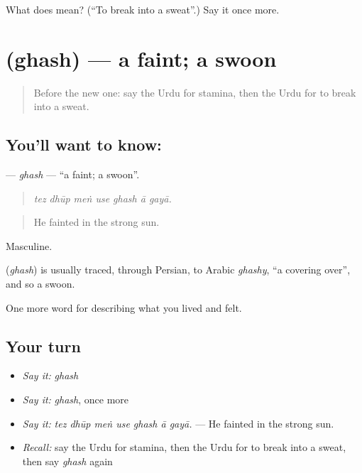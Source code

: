 \begin{tcolorbox}[breakable,colback=teal!4,colframe=teal!35!black,title={Before you move on}]
What does  mean? (\textquotedblleft{}To break into a sweat\textquotedblright{}.) Say it once more.
\end{tcolorbox}
\section[\texorpdfstring{\ur{غش} (ghash)}{غش (ghash)}]{ (ghash) — a faint; a swoon}

\label{lesson:UR-C470-ghash}



\begin{quote}
Before the new one: say the Urdu for stamina, then the Urdu for to break into a sweat.
\end{quote}

\subsection*{You'll want to know: }
\textbf{} — \emph{ghash} — \textquotedblleft{}a faint; a swoon\textquotedblright{}.

\begin{quote}
      
\end{quote}

\begin{quote}
\emph{tez dhūp meṅ use ghash ā gayā.}
\end{quote}

\begin{quote}
He fainted in the strong sun.
\end{quote}

Masculine.

\begin{cousinweb}
\textbf{} (\emph{ghash}) is usually traced, through Persian, to Arabic \emph{ghashy}, \textquotedblleft{}a covering over\textquotedblright{}, and so a swoon.
\end{cousinweb}

\begin{grammarlens}[title={What you've built}]
One more word for describing what you lived and felt.
\end{grammarlens}

\subsection*{Your turn}
\begin{itemize}
\raggedright
  \item \emph{Say it:} \emph{ghash}
  \item \emph{Say it:} \emph{ghash}, once more
  \item \emph{Say it:} \emph{tez dhūp meṅ use ghash ā gayā.} — He fainted in the strong sun.
  \item \emph{Recall:} say the Urdu for stamina, then the Urdu for to break into a sweat, then say \emph{ghash} again
\end{itemize}

